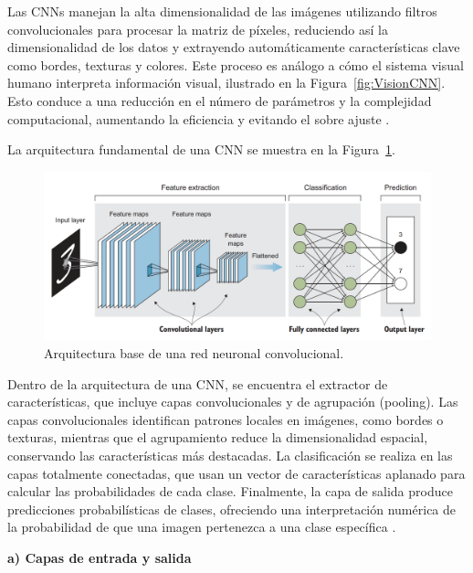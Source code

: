 Las CNNs manejan la alta dimensionalidad de las imágenes utilizando filtros convolucionales para procesar la matriz de píxeles, reduciendo así la dimensionalidad de los datos y extrayendo automáticamente características clave como bordes, texturas y colores. Este proceso es análogo a cómo el sistema visual humano interpreta información visual, ilustrado en la Figura~\ref{fig:VisionCNN}. Esto conduce a una reducción en el número de parámetros y la complejidad computacional, aumentando la eficiencia y evitando el sobre ajuste \cite{geron2019hands}.

La arquitectura fundamental de una CNN se muestra en la Figura~\ref{fig:ArquitecturaCNN}.

\begin{figure}[H]
    \begin{center}
        \includegraphics[width=\textwidth]{Images/ArquitecturaCNN.png}
    \end{center}
    \caption{Arquitectura base de una red neuronal convolucional.}
    \label{fig:ArquitecturaCNN}
\end{figure}

Dentro de la arquitectura de una CNN, se encuentra el extractor de características, que incluye capas convolucionales y de agrupación (pooling). Las capas convolucionales identifican patrones locales en imágenes, como bordes o texturas, mientras que el agrupamiento reduce la dimensionalidad espacial, conservando las características más destacadas. La clasificación se realiza en las capas totalmente conectadas, que usan un vector de características aplanado para calcular las probabilidades de cada clase. Finalmente, la capa de salida produce predicciones probabilísticas de clases, ofreciendo una interpretación numérica de la probabilidad de que una imagen pertenezca a una clase específica \cite{elgendy2020deep}.

\textbf{a) Capas de entrada y salida}

